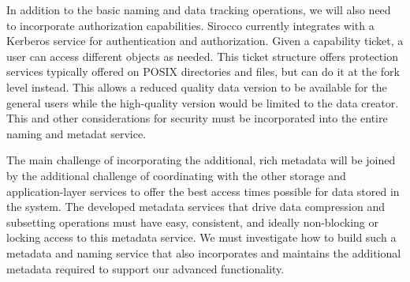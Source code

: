 In addition to the basic naming and data tracking operations, we will also need
to incorporate authorization capabilities. Sirocco currently integrates with a
Kerberos service for authentication and authorization. Given a capability
ticket, a user can access different objects as needed. This ticket structure
offers protection services typically offered on POSIX directories and files,
but can do it at the fork level instead. This allows a reduced quality data
version to be available for the general users while the high-quality version
would be limited to the data creator. This and other considerations for
security must be incorporated into the entire naming and metadat service.

The main challenge of incorporating the additional, rich metadata will be
joined by the additional challenge of coordinating with the other storage and
application-layer services to offer the best access times possible for data
stored in the system. The developed metadata services that drive data
compression and subsetting operations must have easy, consistent, and ideally
non-blocking or locking access to this metadata service. We must investigate
how to build such a metadata and naming service that also incorporates and
maintains the additional metadata required to support our advanced
functionality.
